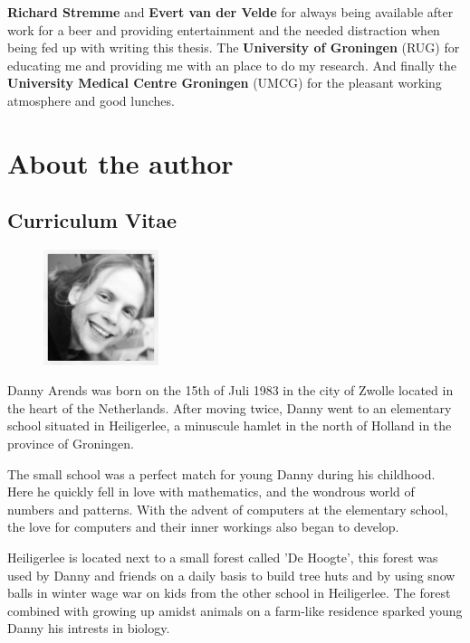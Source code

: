{\bf Richard Stremme} and {\bf Evert van der Velde} for always being available after work for a beer and providing
entertainment and the needed distraction when being fed up with writing this thesis.
The {\bf University of Groningen} (RUG) for educating me and providing me with an place to do my research. And 
finally the {\bf University Medical Centre Groningen} (UMCG) for the pleasant working atmosphere and good lunches.

\newpage

\section{About the author}
\subsection{Curriculum Vitae}

\begin{figure}
  \centering
  \includegraphics[width=0.3\textwidth]{eps/image_6_1.eps}
\end{figure}

Danny Arends was born on the 15th of Juli 1983 in the city of Zwolle located in the heart 
of the Netherlands. After moving twice, Danny went to an elementary school situated in 
Heiligerlee, a minuscule hamlet in the north of Holland in the province of Groningen. 

The small school was a perfect match for young Danny during his childhood. Here he quickly 
fell in love with mathematics, and the wondrous world of numbers and patterns. With the 
advent of computers at the elementary school, the love for computers and their inner 
workings also began to develop.

Heiligerlee is located next to a small forest called 'De Hoogte', this forest was used 
by Danny and friends on a daily basis to build tree huts and by using snow balls in winter 
wage war on kids from the other school in Heiligerlee. The forest combined with growing up 
amidst animals on a farm-like residence sparked young Danny his intrests in biology.

